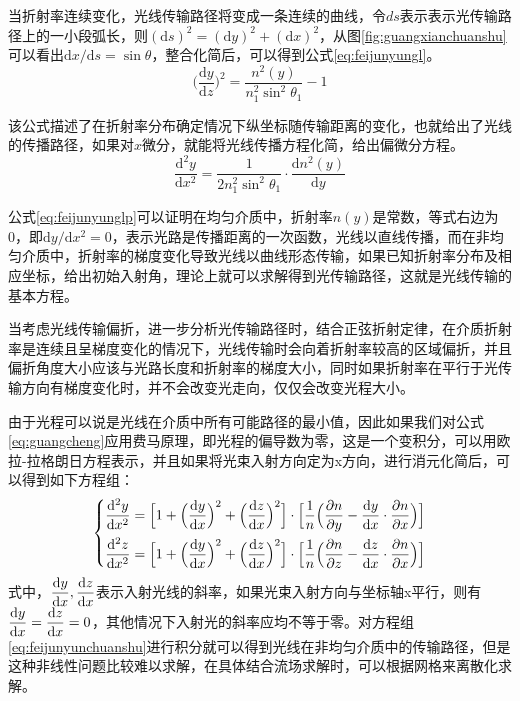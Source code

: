当折射率连续变化，光线传输路径将变成一条连续的曲线，令$ds$表示表示光传输路径上的一小段弧长，则$(\mathrm{d}s)^2=(\mathrm{d}y)^2+(\mathrm{d}x)^2$，从图\ref{fig:guangxianchuanshu}可以看出$\mathrm{d}x/\mathrm{d}s=\sin\theta$，整合化简后，可以得到公式\eqref{eq:feijunyungl}。
\begin{equation}
\big(\frac{\mathrm{d}y}{\mathrm{d}z}\big)^2=\frac{n^2(y)}{n_1^2\sin^2\theta_1}-1
\label{eq:feijunyungl}
\end{equation}

该公式描述了在折射率分布确定情况下纵坐标随传输距离的变化，也就给出了光线的传播路径，如果对$x$微分，就能将光线传播方程化简，给出偏微分方程。
\begin{equation}
\frac{\mathrm{
d}^2y}{\mathrm{d}x^2}=\frac{1}{2n_1^2\sin^2\theta_1}\cdot\frac{\mathrm{d}n^2(y)}{\mathrm{d}y}
\label{eq:feijunyunglp}
\end{equation}

公式\eqref{eq:feijunyunglp}可以证明在均匀介质中，折射率$n(y)$是常数，等式右边为0，即$\mathrm{d}y/\mathrm{d}x^2=0$，表示光路是传播距离的一次函数，光线以直线传播，而在非均匀介质中，折射率的梯度变化导致光线以曲线形态传输，如果已知折射率分布及相应坐标，给出初始入射角，理论上就可以求解得到光传输路径，这就是光线传输的基本方程。

当考虑光线传输偏折，进一步分析光传输路径时，结合正弦折射定律，在介质折射率是连续且呈梯度变化的情况下，光线传输时会向着折射率较高的区域偏折，并且偏折角度大小应该与光路长度和折射率的梯度大小，同时如果折射率在平行于光传输方向有梯度变化时，并不会改变光走向，仅仅会改变光程大小。

由于光程可以说是光线在介质中所有可能路径的最小值，因此如果我们对公式\eqref{eq:guangcheng}应用费马原理，即光程的偏导数为零，这是一个变积分，可以用欧拉-拉格朗日方程表示，并且如果将光束入射方向定为x方向，进行消元化简后，可以得到如下方程组：
\begin{equation}
\left\{
\begin{aligned}
\frac{{\rm d}^2y}{{\rm d}x^2}=\Big[1+\Big(\frac{{\rm d} y}{{\rm d}x}\Big)^2+\Big(\frac{{\rm d}z}{{\rm d}x}\Big)^2\Big]\cdot
\Big[\frac{1}{n}\Big(\frac{\partial n}{\partial y}-\frac{{\rm d}y}{{\rm d}x}\cdot\frac{\partial n}{\partial x}\Big)\Big]\\
\frac{{\rm d}^2z}{{\rm d}x^2}=\Big[1+\Big(\frac{{\rm d} y}{{\rm d}x}\Big)^2+\Big(\frac{{\rm d}z}{{\rm d}x}\Big)^2\Big]\cdot
\Big[\frac{1}{n}\Big(\frac{\partial n}{\partial z}-\frac{{\rm d}z}{{\rm d}x}\cdot\frac{\partial n}{\partial x}\Big)\Big]
\end{aligned}\right.
\label{eq:feijunyunchuanshu}
\end{equation}
式中，$\dfrac{{\rm d}y}{{\rm d}x},\dfrac{{\rm d}z}{{\rm d}x}$表示入射光线的斜率，如果光束入射方向与坐标轴x平行，则有$\dfrac{{\rm d}y}{{\rm d}x}=\dfrac{{\rm d}z}{{\rm d}x}=0$，其他情况下入射光的斜率应均不等于零。对方程组\eqref{eq:feijunyunchuanshu}进行积分就可以得到光线在非均匀介质中的传输路径，但是这种非线性问题比较难以求解，在具体结合流场求解时，可以根据网格来离散化求解。
